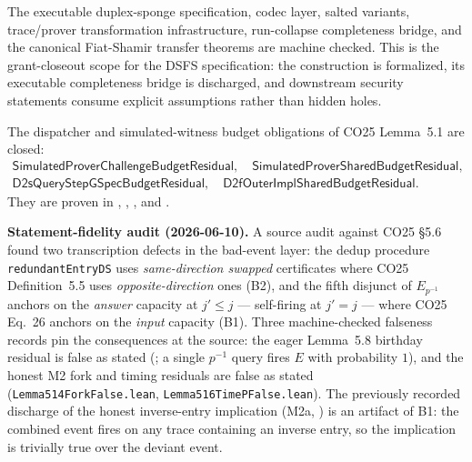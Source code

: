 \begin{remark}
    The executable duplex-sponge specification, codec layer, salted variants, trace/prover
    transformation infrastructure, run-collapse completeness bridge, and the canonical
    Fiat-Shamir transfer theorems are machine checked. This is the grant-closeout scope for
    the DSFS specification: the construction is formalized, its executable completeness bridge
    is discharged, and downstream security statements consume explicit assumptions rather than
    hidden holes.

    The dispatcher and simulated-witness budget obligations of CO25 Lemma~5.1 are closed:
    \[
    \begin{gathered}
    \mathsf{SimulatedProverChallengeBudgetResidual},\quad
    \mathsf{SimulatedProverSharedBudgetResidual},\\
    \mathsf{D2sQueryStepGSpecBudgetResidual},\quad
    \mathsf{D2fOuterImplSharedBudgetResidual}.
    \end{gathered}
    \]
    They are proven in ,
    ,
    , and
    .

    \textbf{Statement-fidelity audit (2026-06-10).} A source audit against CO25
    \S5.6 found two transcription defects in the bad-event layer: the dedup procedure
    \texttt{redundantEntryDS} uses \emph{same-direction swapped} certificates where CO25
    Definition~5.5 uses \emph{opposite-direction} ones (B2), and the fifth disjunct of
    $E_{p^{-1}}$ anchors on the \emph{answer} capacity at $j' \le j$ — self-firing at
    $j' = j$ — where CO25 Eq.~26 anchors on the \emph{input} capacity (B1). Three
    machine-checked falseness records pin the consequences at the source: the eager
    Lemma~5.8 birthday residual is false as stated
    (; a single
    $p^{-1}$ query fires $E$ with probability $1$), and the honest M2 fork and timing
    residuals are false as stated (\texttt{Lemma514ForkFalse.lean},
    \texttt{Lemma516TimePFalse.lean}). The previously recorded discharge of the honest
    inverse-entry implication (M2a, ) is an
    artifact of B1: the combined event fires on any trace containing an inverse entry, so
    the implication is trivially true over the deviant event.


\end{remark}
